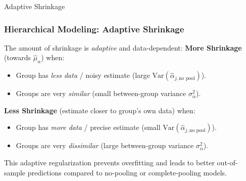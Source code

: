 \documentclass[aspectratio=169]{beamer}
\begin{document}
\begin{frame}{Adaptive Shrinkage}
    \frametitle{Hierarchical Modeling: Adaptive Shrinkage}
    The amount of shrinkage is \emph{adaptive} and data-dependent:
    \medskip
    \textbf{More Shrinkage} (towards $\hat{\mu}_{\alpha}$) when:
    \begin{itemize}
        \item Group has \emph{less data} / noisy estimate (large $\text{Var}(\hat{\alpha}_{j, \text{no pool}})$).
        \item Groups are very \emph{similar} (small between-group variance $\sigma^2_{\alpha}$).
    \end{itemize}
    \pause
    \medskip
    \textbf{Less Shrinkage} (estimate closer to group's own data) when:
    \begin{itemize}
        \item Group has \emph{more data} / precise estimate (small $\text{Var}(\hat{\alpha}_{j, \text{no pool}})$).
        \item Groups are very \emph{dissimilar} (large between-group variance $\sigma^2_{\alpha}$).
    \end{itemize}
    \pause
    \medskip
    This adaptive regularization prevents overfitting and leads to better out-of-sample predictions compared to no-pooling or complete-pooling models.
\end{frame}
\end{document}
